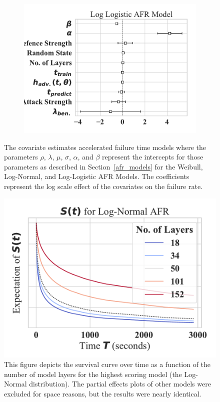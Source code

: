 \begin{figure}[h!]
\begin{subfigure}[t]{0.3\textwidth}
        \includegraphics[width=\textwidth]{cifar100/log_logistic_aft.pdf}
    \end{subfigure}
    
    \caption{The covariate estimates accelerated failure time models where the parameters $\rho$, $\lambda$, $\mu$, $\sigma$, $\alpha$, and $\beta$ represent the intercepts for those parameters as described in Section~\ref{afr_models} for the Weibull, Log-Normal, and Log-Logistic AFR Models. The coefficients represent the log scale effect of the covariates on the failure rate.}
    \label{fig:cifar100_afr_models}
\end{figure}

\begin{figure}[h!]
    \centering\includegraphics[width=.5\textwidth]{cifar100/log_normal_partial_effects.pdf}
    \caption{This figure depicts the survival curve over time as a function of the number of model layers for the highest scoring model (the Log-Normal distribution). The partial effects plots of other models were excluded for space reasons, but the results were nearly identical.}
    \label{fig:cifar100_cifar100_layers}
\end{figure}
